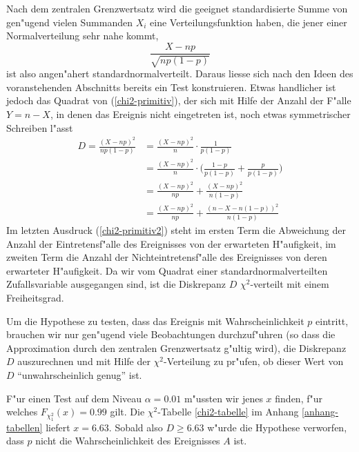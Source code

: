 Nach dem zentralen Grenzwertsatz wird die geeignet standardisierte Summe
von gen"ugend vielen Summanden $X_i$ eine Verteilungsfunktion haben,
die jener einer Normalverteilung sehr nahe kommt, 
\begin{equation}
\frac{X-np}{\sqrt{np(1-p)}}
\label{chi2-primitiv}
\end{equation}
ist also angen"ahert standardnormalverteilt. Daraus liesse sich nach den
Ideen des voranstehenden Abschnitts bereits ein Test konstruieren.
Etwas handlicher ist jedoch das Quadrat von (\ref{chi2-primitiv}), der
sich mit Hilfe der Anzahl der F"alle $Y=n-X$, in denen das Ereignis
nicht eingetreten ist, noch etwas symmetrischer Schreiben l"asst
\begin{align}
D=\frac{(X-np)^2}{np(1-p)}
&=
\frac{(X-np)^2}{n}\cdot \frac{1}{p(1-p)}\nonumber
\\
&=
\frac{(X-np)^2}{n}\cdot
\biggl(
\frac{1-p}{p(1-p)} +
\frac{p}{p(1-p)}
\biggr)\nonumber
\\
&=
\frac{(X-np)^2}{np}+\frac{(X-np)^2}{n(1-p)}\nonumber
\\
&=
\frac{(X-np)^2}{np}+\frac{(n-X-n(1-p))^2}{n(1-p)}\label{chi2-primitiv2}
\end{align}
Im letzten Ausdruck (\ref{chi2-primitiv2})
steht im ersten Term die Abweichung der
Anzahl der Eintretensf"alle des Ereignisses von der erwarteten H"aufigkeit,
im zweiten Term die Anzahl der Nichteintretensf"alle des Ereignisses
von deren erwarteter H"aufigkeit.
Da wir vom Quadrat einer standardnormalverteilten Zufallsvariable ausgegangen
sind, ist die Diskrepanz $D$ $\chi^2$-verteilt mit einem Freiheitsgrad.

Um die Hypothese zu testen, dass das Ereignis mit Wahrscheinlichkeit $p$
eintritt, brauchen wir nur gen"ugend viele Beobachtungen durchzuf"uhren
(so dass die Approximation durch den zentralen Grenzwertsatz g"ultig wird),
die Diskrepanz $D$ auszurechnen und mit Hilfe der $\chi^2$-Verteilung
zu pr"ufen, ob dieser Wert von $D$ ``unwahrscheinlich genug'' ist.

F"ur einen Test auf dem Niveau $\alpha=0.01$ m"ussten wir jenes
$x$ finden, f"ur welches $F_{\chi^2_1}(x)=0.99$ gilt. Die $\chi^2$-Tabelle
\ref{chi2-tabelle} im Anhang \ref{anhang-tabellen}
liefert $x=6.63$. Sobald also $D\ge 6.63$ w"urde die Hypothese verworfen,
dass $p$ nicht die Wahrscheinlichkeit des Ereignisses $A$ ist.

